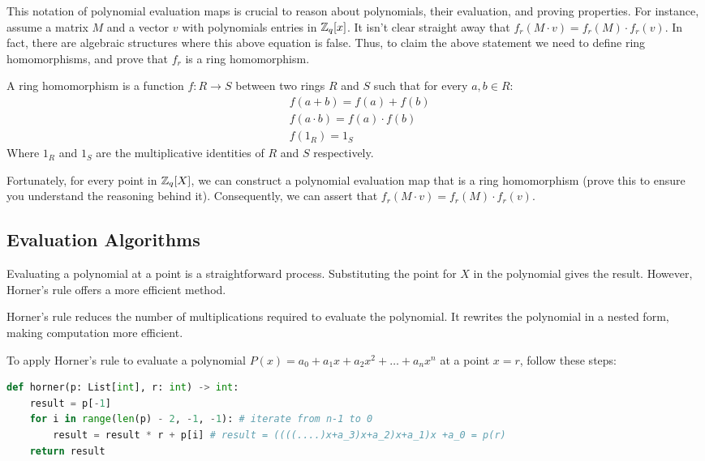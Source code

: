 This notation of polynomial evaluation maps is crucial to reason about polynomials, their evaluation, 
and proving properties. For instance, assume a matrix $M$ and a vector $v$ with polynomials entries in $\mathbb{Z}_q[x]$.
It isn't clear straight away that $f_r(M\cdot v) = f_r(M)\cdot f_r(v)$. In fact, there are algebraic 
structures where this above equation is false. 
Thus, to claim the above statement we need to define ring homomorphisms, and prove that $f_r$ is a ring homomorphism.

\begin{defn}
  A ring homomorphism is a function $f:R\to S$ between two rings $R$ and $S$ such that for every $a,b\in R$:
  \begin{align}
    &f(a+b)=f(a)+f(b)\\
    &f(a\cdot b)=f(a)\cdot f(b) \\
    &f(1_R)=1_S
  \end{align}
   Where $1_R$ and $1_S$ are the multiplicative identities of $R$ and $S$ respectively.
\end{defn}

Fortunately, for every point in $\mathbb{Z}_q[X]$, we can construct a polynomial evaluation map that is 
a ring homomorphism (prove this to ensure you understand the reasoning behind it).
Consequently, we can assert that $f_r(M\cdot v) = f_r(M)\cdot f_r(v)$.

\subsection{Evaluation Algorithms}
Evaluating a polynomial at a point is a straightforward process.
Substituting the point for $X$ in the polynomial gives the result. 
However, Horner's rule offers a more efficient method.

Horner's rule reduces the number of multiplications required to evaluate the polynomial.
It rewrites the polynomial in a nested form, making computation more efficient.

To apply Horner's rule to evaluate a polynomial $P(x) = a_0 + a_1x + a_2x^2 + \dots + a_nx^n$ at a 
point $x = r$, follow these steps:

\begin{lstlisting}[language=Python,
  caption={Horner's rule algorithm in python}
]
def horner(p: List[int], r: int) -> int:
    result = p[-1]
    for i in range(len(p) - 2, -1, -1): # iterate from n-1 to 0
        result = result * r + p[i] # result = ((((....)x+a_3)x+a_2)x+a_1)x +a_0 = p(r)
    return result
\end{lstlisting}\label{algorithm:polynomial:evaluation}


